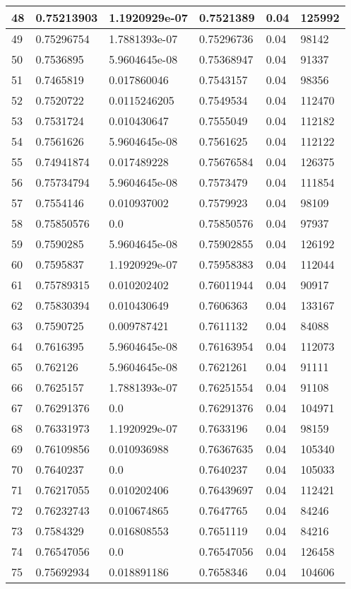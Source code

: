 \begin{longtable}{|l|l|l|l|l|l|}
48 & 0.75213903 & 1.1920929e-07 & 0.7521389 & 0.04 & 125992 \\ \hline 
49 & 0.75296754 & 1.7881393e-07 & 0.75296736 & 0.04 & 98142 \\ \hline 
50 & 0.7536895 & 5.9604645e-08 & 0.75368947 & 0.04 & 91337 \\ \hline 
51 & 0.7465819 & 0.017860046 & 0.7543157 & 0.04 & 98356 \\ \hline 
52 & 0.7520722 & 0.0115246205 & 0.7549534 & 0.04 & 112470 \\ \hline 
53 & 0.7531724 & 0.010430647 & 0.7555049 & 0.04 & 112182 \\ \hline 
54 & 0.7561626 & 5.9604645e-08 & 0.7561625 & 0.04 & 112122 \\ \hline 
55 & 0.74941874 & 0.017489228 & 0.75676584 & 0.04 & 126375 \\ \hline 
56 & 0.75734794 & 5.9604645e-08 & 0.7573479 & 0.04 & 111854 \\ \hline 
57 & 0.7554146 & 0.010937002 & 0.7579923 & 0.04 & 98109 \\ \hline 
58 & 0.75850576 & 0.0 & 0.75850576 & 0.04 & 97937 \\ \hline 
59 & 0.7590285 & 5.9604645e-08 & 0.75902855 & 0.04 & 126192 \\ \hline 
60 & 0.7595837 & 1.1920929e-07 & 0.75958383 & 0.04 & 112044 \\ \hline 
61 & 0.75789315 & 0.010202402 & 0.76011944 & 0.04 & 90917 \\ \hline 
62 & 0.75830394 & 0.010430649 & 0.7606363 & 0.04 & 133167 \\ \hline 
63 & 0.7590725 & 0.009787421 & 0.7611132 & 0.04 & 84088 \\ \hline 
64 & 0.7616395 & 5.9604645e-08 & 0.76163954 & 0.04 & 112073 \\ \hline 
65 & 0.762126 & 5.9604645e-08 & 0.7621261 & 0.04 & 91111 \\ \hline 
66 & 0.7625157 & 1.7881393e-07 & 0.76251554 & 0.04 & 91108 \\ \hline 
67 & 0.76291376 & 0.0 & 0.76291376 & 0.04 & 104971 \\ \hline 
68 & 0.76331973 & 1.1920929e-07 & 0.7633196 & 0.04 & 98159 \\ \hline 
69 & 0.76109856 & 0.010936988 & 0.76367635 & 0.04 & 105340 \\ \hline 
70 & 0.7640237 & 0.0 & 0.7640237 & 0.04 & 105033 \\ \hline 
71 & 0.76217055 & 0.010202406 & 0.76439697 & 0.04 & 112421 \\ \hline 
72 & 0.76232743 & 0.010674865 & 0.7647765 & 0.04 & 84246 \\ \hline 
73 & 0.7584329 & 0.016808553 & 0.7651119 & 0.04 & 84216 \\ \hline 
74 & 0.76547056 & 0.0 & 0.76547056 & 0.04 & 126458 \\ \hline 
75 & 0.75692934 & 0.018891186 & 0.7658346 & 0.04 & 104606 \\ \hline 
\end{longtable}